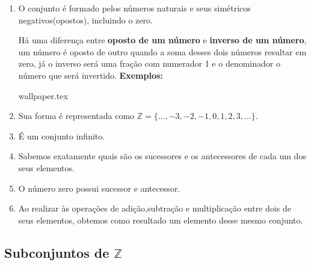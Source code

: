 \documentclass[10pt]{article}
\begin{document}
    \begin{enumerate}[label=\textbf{(\Roman*)}]
        \item O conjunto é formado pelos números naturais e seus simétricos negativos(opostos), incluindo o zero.
            \begin{obs}
                Há uma diferença entre \textbf{oposto de um número} e \textbf{inverso de um número}, um número é oposto de outro quando a soma desses dois números resultar em zero, já o inverso será uma fração com numerador 1 e o denominador o número que será invertido.
                \textbf{Exemplos:}
                \begin{enumerate}
                \end{enumerate}
            \end{obs}
\newpage
{wallpaper.tex} %
        \item Sua forma é representada como \( \mathbb{Z} = \{\ldots, -3, -2, -1, 0, 1, 2, 3, \ldots\}\).
        \item É um conjunto infinito.
        \item Sabemos exatamente quais são os sucessores e os antecessores de cada um dos seus elementos.
        \item O número zero possui sucessor e antecessor.
        \item Ao realizar às operações de adição,subtração e multiplicação entre dois de seus elementos, obtemos como resultado um elemento desse mesmo conjunto.
    \end{enumerate}
\subsection*{Subconjuntos de \( \mathbb{Z} \)}
\end{document}
